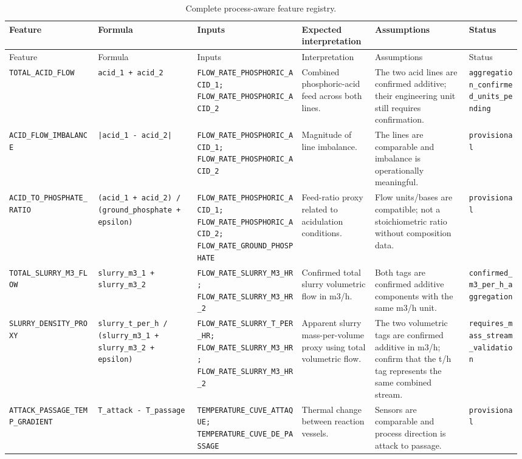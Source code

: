 \documentclass[10pt,a4paper]{article}
\begin{document}
\begin{landscape}\tiny\begin{longtable}{p{0.17\linewidth}p{0.19\linewidth}p{0.20\linewidth}p{0.14\linewidth}p{0.18\linewidth}p{0.10\linewidth}}\caption{Complete process-aware feature registry.}\\\toprule Feature & Formula & Inputs & Expected interpretation & Assumptions & Status \\\midrule\endfirsthead\toprule Feature & Formula & Inputs & Interpretation & Assumptions & Status \\\midrule\endhead
\nolinkurl{TOTAL_ACID_FLOW} & \nolinkurl{acid_1 + acid_2} & \nolinkurl{FLOW_RATE_PHOSPHORIC_ACID_1; FLOW_RATE_PHOSPHORIC_ACID_2} & Combined phosphoric-acid feed across both lines. & The two acid lines are confirmed additive; their engineering unit still requires confirmation. & \nolinkurl{aggregation_confirmed_units_pending} \\
\nolinkurl{ACID_FLOW_IMBALANCE} & \nolinkurl{|acid_1 - acid_2|} & \nolinkurl{FLOW_RATE_PHOSPHORIC_ACID_1; FLOW_RATE_PHOSPHORIC_ACID_2} & Magnitude of line imbalance. & The lines are comparable and imbalance is operationally meaningful. & \nolinkurl{provisional} \\
\nolinkurl{ACID_TO_PHOSPHATE_RATIO} & \nolinkurl{(acid_1 + acid_2) / (ground_phosphate + epsilon)} & \nolinkurl{FLOW_RATE_PHOSPHORIC_ACID_1; FLOW_RATE_PHOSPHORIC_ACID_2; FLOW_RATE_GROUND_PHOSPHATE} & Feed-ratio proxy related to acidulation conditions. & Flow units/bases are compatible; not a stoichiometric ratio without composition data. & \nolinkurl{provisional} \\
\nolinkurl{TOTAL_SLURRY_M3_FLOW} & \nolinkurl{slurry_m3_1 + slurry_m3_2} & \nolinkurl{FLOW_RATE_SLURRY_M3_HR; FLOW_RATE_SLURRY_M3_HR_2} & Confirmed total slurry volumetric flow in m3/h. & Both tags are confirmed additive components with the same m3/h unit. & \nolinkurl{confirmed_m3_per_h_aggregation} \\
\nolinkurl{SLURRY_DENSITY_PROXY} & \nolinkurl{slurry_t_per_h / (slurry_m3_1 + slurry_m3_2 + epsilon)} & \nolinkurl{FLOW_RATE_SLURRY_T_PER_HR; FLOW_RATE_SLURRY_M3_HR; FLOW_RATE_SLURRY_M3_HR_2} & Apparent slurry mass-per-volume proxy using total volumetric flow. & The two volumetric tags are confirmed additive in m3/h; confirm that the t/h tag represents the same combined stream. & \nolinkurl{requires_mass_stream_validation} \\
\nolinkurl{ATTACK_PASSAGE_TEMP_GRADIENT} & \nolinkurl{T_attack - T_passage} & \nolinkurl{TEMPERATURE_CUVE_ATTAQUE; TEMPERATURE_CUVE_DE_PASSAGE} & Thermal change between reaction vessels. & Sensors are comparable and process direction is attack to passage. & \nolinkurl{provisional} \\

\end{longtable}
\end{landscape}
\end{document}
